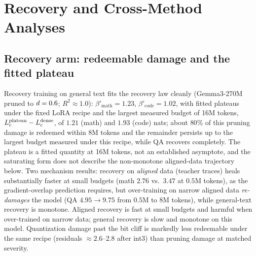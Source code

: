 \FloatBarrier
\section{Recovery and Cross-Method Analyses}
\label{sec:app_cross}
\subsection{Recovery arm: redeemable damage and the fitted plateau}
\label{sec:recovery}

Recovery training on general text fits the recovery law cleanly
(Gemma3-270M pruned to $d=0.6$; $R^2\approx1.0$):
$\beta'_{\text{math}}=1.23$, $\beta'_{\text{code}}=1.02$, with
fitted plateaus under the fixed LoRA recipe and the largest measured
budget of 16M tokens, $L_{c}^{\text{plateau}}-L_{c}^{\text{dense}}$,
of $1.21$ (math) and $1.93$ (code) nats; about $80\%$ of this pruning
damage is redeemed within 8M tokens and the remainder persists up to
the largest budget measured under this recipe, while QA recovers
completely. The plateau is a fitted quantity at 16M tokens, not an
established asymptote, and the saturating form does not describe the
non-monotone aligned-data trajectory below.  Two mechanism results:
recovery on \emph{aligned} data (teacher traces) heals substantially
faster at small budgets (math $2.76$ vs.\ $3.47$ at $0.5$M tokens),
as the gradient-overlap prediction requires, but over-training on
narrow aligned data \emph{re-damages} the model (QA $4.95\to9.75$
from $0.5$M to $8$M tokens), while general-text recovery is monotone.
Aligned recovery is fast at small budgets and harmful when over-trained on narrow data; general recovery is slow and monotone on this model. Quantization damage past the bit cliff is markedly less redeemable
under the same recipe (residuals $\approx2.6$--$2.8$ after int3) than
pruning damage at matched severity.


